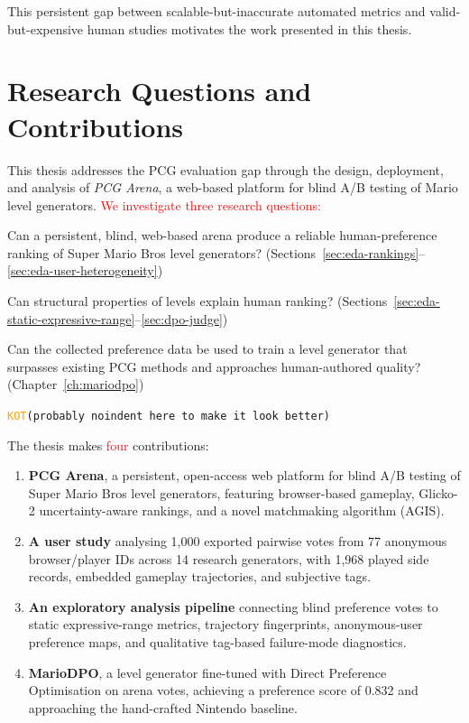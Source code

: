 \documentclass[shortabstract, mgr, english]{iithesis}
\newcommand{\DEBUG}[1]{{#1}} %
\newcommand{\KOT}[1]{\DEBUG{\tt{\textcolor{orange}{KOT}(}{#1}{)}}}
\newcommand{\changed}[1]{\textcolor{red}{#1}}
\begin{document}
This persistent gap between scalable-but-inaccurate automated metrics and
valid-but-expensive human studies motivates the work presented in this thesis.

\section{Research Questions and Contributions}
\label{sec:intro-rq}

This thesis addresses the PCG evaluation gap through the design, deployment, and
analysis of \emph{PCG Arena}, a web-based platform for blind A/B testing of
Mario level generators. \changed{We investigate three research questions:}

\begingroup\color{red}
\begin{description}[style=nextline]
  \item[RQ1 (Measurement)] Can a persistent, blind, web-based arena produce a
    reliable human-preference ranking of Super Mario Bros level generators?
    (Sections~\ref{sec:eda-rankings}--\ref{sec:eda-user-heterogeneity})
  \item[RQ2 (Metrics)] Can structural properties of levels explain human ranking?
    (Sections~\ref{sec:eda-static-expressive-range}--\ref{sec:dpo-judge})
  \item[RQ3 (Generation)] Can the collected preference data be used to train a
    level generator that surpasses existing PCG methods and approaches
    human-authored quality? (Chapter~\ref{ch:mariodpo})
\end{description}
\endgroup

\KOT{probably noindent here to make it look better}

\noindent The thesis makes \changed{four} contributions:

\begin{enumerate}
    \item \textbf{PCG Arena}, a persistent, open-access web platform for blind
          A/B testing of Super Mario Bros level generators, featuring
          browser-based gameplay, Glicko-2 uncertainty-aware rankings, and a
          novel matchmaking algorithm (AGIS).
    \item \textbf{A user study} analysing 1,000 exported pairwise votes from 77
          anonymous browser/player IDs across 14 research generators, with 1,968
          played side records, embedded gameplay trajectories, and subjective
          tags.
    \item \textbf{An exploratory analysis pipeline} connecting blind preference
          votes to static expressive-range metrics, trajectory fingerprints,
          anonymous-user preference maps, and qualitative tag-based failure-mode
          diagnostics.
    \item \textbf{MarioDPO}, a level generator fine-tuned with Direct Preference
          Optimisation on arena votes, achieving a preference score of 0.832 and
          approaching the hand-crafted Nintendo baseline.
\end{enumerate}
\end{document}
